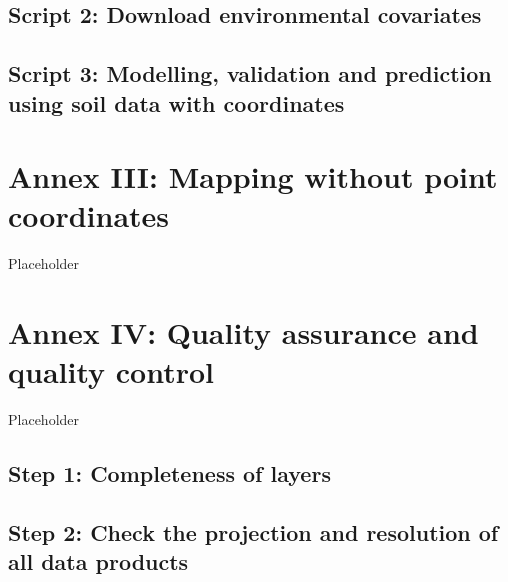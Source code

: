 \documentclass[
  10pt,
  b5paper,
  oneside]{book}
\begin{document}
\hypertarget{script-2-download-environmental-covariates}{%
\section*{Script 2: Download environmental covariates}\label{script-2-download-environmental-covariates}}

\hypertarget{script-3-modelling-validation-and-prediction-using-soil-data-with-coordinates}{%
\section*{Script 3: Modelling, validation and prediction using soil data with coordinates}\label{script-3-modelling-validation-and-prediction-using-soil-data-with-coordinates}}

\hypertarget{annex-iii-mapping-without-point-coordinates}{%
\chapter*{Annex III: Mapping without point coordinates}\label{annex-iii-mapping-without-point-coordinates}}

Placeholder

\hypertarget{annex-iv-quality-assurance-and-quality-control}{%
\chapter*{Annex IV: Quality assurance and quality control}\label{annex-iv-quality-assurance-and-quality-control}}

Placeholder

\hypertarget{step-1-completeness-of-layers}{%
\section*{Step 1: Completeness of layers}\label{step-1-completeness-of-layers}}

\hypertarget{step-2-check-the-projection-and-resolution-of-all-data-products}{%
\section*{Step 2: Check the projection and resolution of all data products}\label{step-2-check-the-projection-and-resolution-of-all-data-products}}
\end{document}
